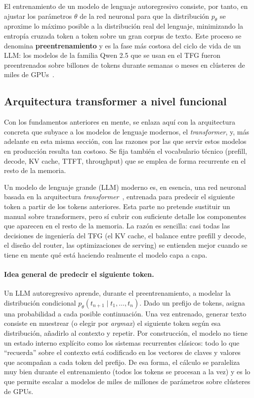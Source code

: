 \documentclass[11pt,a4paper]{article}
\begin{document}
El entrenamiento de un modelo de lenguaje autoregresivo consiste, por tanto, en ajustar los parámetros $\theta$ de la red neuronal para que la distribución $p_\theta$ se aproxime lo máximo posible a la distribución real del lenguaje, minimizando la entropía cruzada token a token sobre un gran corpus de texto. Este proceso se denomina \textbf{preentrenamiento} y es la fase más costosa del ciclo de vida de un LLM: los modelos de la familia Qwen 2.5 que se usan en el TFG fueron preentrenados sobre billones de tokens durante semanas o meses en clústeres de miles de GPUs~\cite{qwen2}.

\subsection{Arquitectura transformer a nivel funcional}

Con los fundamentos anteriores en mente, se enlaza aquí con la arquitectura concreta que subyace a los modelos de lenguaje modernos, el \textit{transformer}, y, más adelante en esta misma sección, con las razones por las que servir estos modelos en producción resulta tan costoso. Se fija también el vocabulario técnico (prefill, decode, KV cache, TTFT, throughput) que se emplea de forma recurrente en el resto de la memoria.

Un modelo de lenguaje grande (LLM) moderno es, en esencia, una red neuronal basada en la arquitectura \textit{transformer}~\cite{vaswani2017attention}, entrenada para predecir el siguiente token a partir de los tokens anteriores. Esta parte no pretende sustituir un manual sobre transformers, pero sí cubrir con suficiente detalle los componentes que aparecen en el resto de la memoria. La razón es sencilla: casi todas las decisiones de ingeniería del TFG (el KV cache, el balance entre prefill y decode, el diseño del router, las optimizaciones de serving) se entienden mejor cuando se tiene en mente qué está haciendo realmente el modelo capa a capa.

\paragraph{Idea general de predecir el siguiente token.} Un LLM autoregresivo aprende, durante el preentrenamiento, a modelar la distribución condicional $p_\theta(t_{n+1} \mid t_1, \dots, t_n)$. Dado un prefijo de tokens, asigna una probabilidad a cada posible continuación. Una vez entrenado, generar texto consiste en muestrear (o elegir por \textit{argmax}) el siguiente token según esa distribución, añadirlo al contexto y repetir. Por construcción, el modelo no tiene un estado interno explícito como los sistemas recurrentes clásicos: todo lo que ``recuerda'' sobre el contexto está codificado en los vectores de claves y valores que acompañan a cada token del prefijo. De esa forma, el cálculo se paraleliza muy bien durante el entrenamiento (todos los tokens se procesan a la vez) y es lo que permite escalar a modelos de miles de millones de parámetros sobre clústeres de GPUs.
\end{document}
